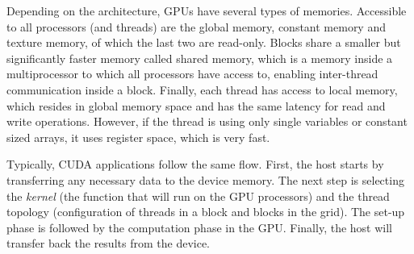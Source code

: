 Depending on the architecture, GPUs have several types of memories.
Accessible to all processors (and threads) are the global memory, constant memory and texture memory, of which the last two are read-only.
Blocks share a smaller but significantly faster memory called shared memory, which is a memory inside a multiprocessor to which all processors have access to, enabling inter-thread communication inside a block.
Finally, each thread has access to local memory, which resides in global memory space and has the same latency for read and write operations.
However, if the thread is using only single variables or constant sized arrays, it uses register space, which is very fast.

Typically, CUDA applications follow the same flow.
First, the host starts by transferring any necessary data to the device memory.
The next step is selecting the \emph{kernel} (the function that will run on the GPU processors) and the thread topology (configuration of threads in a block and blocks in the grid).
The set-up phase is followed by the computation phase in the GPU.
Finally, the host will transfer back the results from the device.
